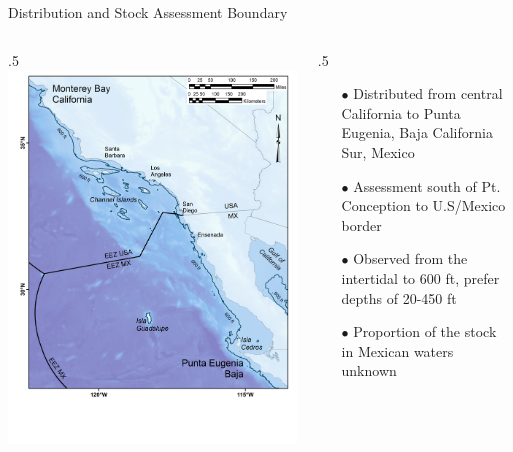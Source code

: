 \documentclass[ignorenonframetext,]{beamer}
\def\begincols{\begin{columns}}
\def\begincol{\begin{column}}
\def\endcol{\end{column}}
\def\endcols{\end{columns}}
\begin{document}
\begin{frame}{Distribution and Stock Assessment Boundary}

\begincols
 \begincol{.5\textwidth} \includegraphics{Figures/assess_region_map.png}

\endcol
 \begincol{.5\textwidth}

\begin{itemize} 
 \item[$\bullet$] Distributed from central California to Punta Eugenia, Baja California Sur, Mexico 
 \item[$\bullet$] Assessment south of Pt. Conception to U.S/Mexico border 
 \item[$\bullet$] Observed from the intertidal to 600 ft,  prefer depths of 20-450 ft  
 \item[$\bullet$] Proportion of the stock in Mexican waters unknown
\end{itemize}

\endcol
\endcols

\end{frame}
\end{document}
